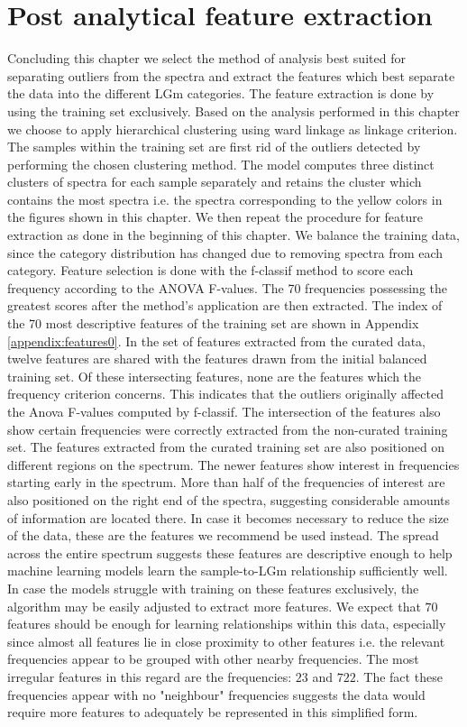 \section{Post analytical feature extraction}
Concluding this chapter we select the method of analysis best suited for separating outliers from the spectra and extract the features which best separate the data into the different LGm categories. The feature extraction is done by using the training set exclusively. Based on the analysis performed in this chapter we choose to apply hierarchical clustering using ward linkage as linkage criterion. The samples within the training set are first rid of the outliers detected by performing the chosen clustering method. The model computes three distinct clusters of spectra for each sample separately and retains the cluster which contains the most spectra i.e. the spectra corresponding to the yellow colors in the figures shown in this chapter. We then repeat the procedure for feature extraction as done in the beginning of this chapter. We balance the training data, since the category distribution has changed due to removing spectra from each category. Feature selection is done with the f-classif method to score each frequency according to the ANOVA F-values. The 70 frequencies possessing the greatest scores after the method's application are then extracted. The index of the 70 most descriptive features of the training set are shown in Appendix \ref{appendix:features0}. In the set of features extracted from the curated data, twelve features are shared with the features drawn from the initial balanced training set. Of these intersecting features, none are the features which the frequency criterion concerns. This indicates that the outliers originally affected the Anova F-values computed by f-classif. The intersection of the features also show certain frequencies were correctly extracted from the non-curated training set. The features extracted from the curated training set are also positioned on different regions on the spectrum. The newer features show interest in frequencies starting early in the spectrum. More than half of the frequencies of interest are also positioned on the right end of the spectra, suggesting considerable amounts of information are located there. In case it becomes necessary to reduce the size of the data, these are the features we recommend be used instead. The spread across the entire spectrum suggests these features are descriptive enough to help machine learning models learn the sample-to-LGm relationship sufficiently well. In case the models struggle with training on these features exclusively, the algorithm may be easily adjusted to extract more features. We expect that $70$ features should be enough for learning relationships within this data, especially since almost all features lie in close proximity to other features i.e. the relevant frequencies appear to be grouped with other nearby frequencies. The most irregular features in this regard are the frequencies: $23$ and $722$. The fact these frequencies appear with no "neighbour" frequencies suggests the data would require more features to adequately be represented in this simplified form. 